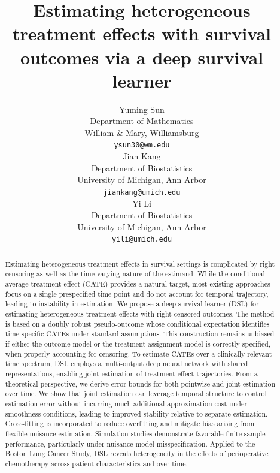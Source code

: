 \documentclass{article}
\title{Estimating heterogeneous treatment effects with survival outcomes via a deep survival learner}
\author{Yuming Sun\\
	Department of Mathematics\\
	William \& Mary, Williamsburg\\
	\texttt{ysun30@wm.edu} \\
	\And
	Jian Kang\\
    Department of Biostatistics\\
	University of Michigan, Ann Arbor\\
	\texttt{jiankang@umich.edu}\\
	\And
	Yi Li\\
	Department of Biostatistics\\
	University of Michigan, Ann Arbor\\
	\texttt{yili@umich.edu}
}
\date{}
\begin{document}
\maketitle

\begin{abstract}
Estimating heterogeneous treatment effects in survival settings is complicated by right censoring as well as the time-varying nature of the estimand. While the conditional average treatment effect (CATE) provides a natural target, most existing approaches focus on a single prespecified time point and do not account for temporal trajectory, leading to instability in estimation. We propose a deep survival learner (DSL) for estimating heterogeneous treatment effects with right-censored outcomes. The method is based on a doubly robust pseudo-outcome whose conditional expectation identifies time-specific CATEs under standard assumptions. This construction remains unbiased if either the outcome model or the treatment assignment model is correctly specified, when properly accounting for censoring. To estimate CATEs over a clinically relevant time spectrum, DSL employs a multi-output deep neural network with shared representations, enabling joint estimation of treatment effect trajectories. From a theoretical perspective, we derive error bounds for both pointwise and joint estimation over time. We show that joint estimation can leverage temporal structure to control estimation error without incurring much additional approximation cost under smoothness conditions, leading to improved stability relative to separate estimation.
Cross-fitting is incorporated to reduce overfitting and mitigate bias arising from flexible nuisance estimation. Simulation studies demonstrate favorable finite-sample performance, particularly under nuisance model misspecification. Applied to the Boston Lung Cancer Study, DSL reveals  heterogeneity in the effects of perioperative chemotherapy across patient characteristics and over time.
\end{abstract}


\end{document}
